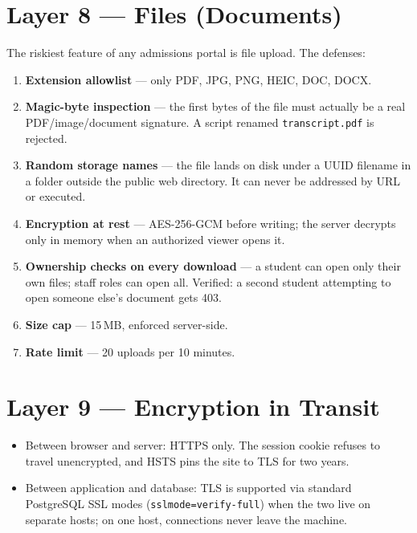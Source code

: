 \documentclass[11pt,letterpaper]{report}
\begin{document}
\section{Layer 8 --- Files (Documents)}

The riskiest feature of any admissions portal is file upload. The defenses:

\begin{enumerate}[leftmargin=1.6em]
  \item \textbf{Extension allowlist} --- only PDF, JPG, PNG, HEIC, DOC, DOCX.
  \item \textbf{Magic-byte inspection} --- the first bytes of the file must
        actually be a real PDF/image/document signature. A script renamed
        \texttt{transcript.pdf} is rejected.
  \item \textbf{Random storage names} --- the file lands on disk under a UUID
        filename in a folder outside the public web directory. It can never be
        addressed by URL or executed.
  \item \textbf{Encryption at rest} --- AES-256-GCM before writing; the server
        decrypts only in memory when an authorized viewer opens it.
  \item \textbf{Ownership checks on every download} --- a student can open only
        their own files; staff roles can open all. Verified: a second student
        attempting to open someone else's document gets 403.
  \item \textbf{Size cap} --- 15\,MB, enforced server-side.
  \item \textbf{Rate limit} --- 20 uploads per 10 minutes.
\end{enumerate}

\section{Layer 9 --- Encryption in Transit}

\begin{itemize}[leftmargin=1.4em]
  \item Between browser and server: HTTPS only. The session cookie refuses to
        travel unencrypted, and HSTS pins the site to TLS for two years.
  \item Between application and database: TLS is supported via standard
        PostgreSQL SSL modes (\texttt{sslmode=verify-full}) when the two live on
        separate hosts; on one host, connections never leave the machine.
\end{itemize}
\end{document}

